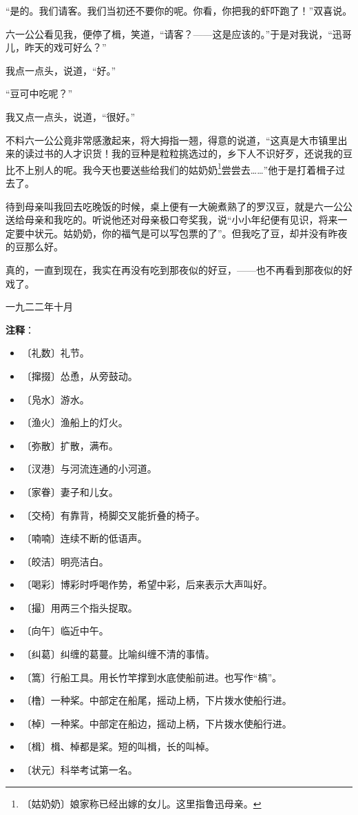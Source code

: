 \documentclass[12pt,UTF-8,openany]{ctexbook}
\begin{document}
\begin{large}
    “是的。我们请客。我们当初还不要你的呢。你看，你把我的虾吓跑了！”双喜说。
    
    六一公公看见我，便停了楫，笑道，“请客？——这是应该的。”于是对我说，“迅哥儿，昨天的戏可好么？”
    
    我点一点头，说道，“好。”
    
    “豆可中吃呢？”
    
    我又点一点头，说道，“很好。”
    
    不料六一公公竟非常感激起来，将大拇指一翘，得意的说道，“这真是大市镇里出来的读过书的人才识货！我的豆种是粒粒挑选过的，乡下人不识好歹，还说我的豆比不上别人的呢。我今天也要送些给我们的姑奶奶\footnote{〔姑奶奶〕娘家称已经出嫁的女儿。这里指鲁迅母亲。}尝尝去……”他于是打着楫子过去了。
    
    待到母亲叫我回去吃晚饭的时候，桌上便有一大碗煮熟了的罗汉豆，就是六一公公送给母亲和我吃的。听说他还对母亲极口夸奖我，说“小小年纪便有见识，将来一定要中状元。姑奶奶，你的福气是可以写包票的了”。但我吃了豆，却并没有昨夜的豆那么好。
    
    真的，一直到现在，我实在再没有吃到那夜似的好豆，——也不再看到那夜似的好戏了。
    
    \hfill 一九二二年十月
    
\end{large}


\newpage

\textbf{注释}：

\vspace{-1em}

\begin{itemize}
    \setlength\itemsep{-0.2em}
    \item 〔礼数〕礼节。
    \item 〔撺掇〕怂恿，从旁鼓动。
    \item 〔凫水〕游水。
    \item 〔渔火〕渔船上的灯火。
    \item 〔弥散〕扩散，满布。
    \item 〔汊港〕与河流连通的小河道。
    \item 〔家眷〕妻子和儿女。
    \item 〔交椅〕有靠背，椅脚交叉能折叠的椅子。
    \item 〔喃喃〕连续不断的低语声。
    \item 〔皎洁〕明亮洁白。
    \item 〔喝彩〕博彩时呼喝作势，希望中彩，后来表示大声叫好。
    \item 〔撮〕用两三个指头捉取。
    \item 〔向午〕临近中午。
    \item 〔纠葛〕纠缠的葛蔓。比喻纠缠不清的事情。
    \item 〔篙〕行船工具。用长竹竿撑到水底使船前进。也写作“槁”。
    \item 〔橹〕一种桨。中部定在船尾，摇动上柄，下片拨水使船行进。
    \item 〔棹〕一种桨。中部定在船边，摇动上柄，下片拨水使船行进。
    \item 〔楫〕楫、棹都是桨。短的叫楫，长的叫棹。
    \item 〔状元〕科举考试第一名。
\end{itemize}
\end{document}
